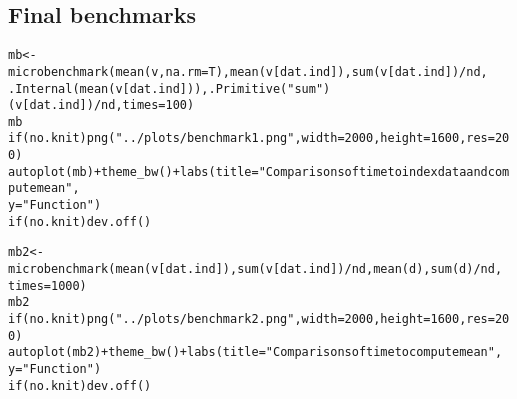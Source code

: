 \documentclass{article}\usepackage[]{graphicx}\usepackage[]{color}
\makeatletter
\newcommand{\hlnum}[1]{\textcolor[rgb]{0.863,0.196,0.184}{#1}}%
\newcommand{\hlstr}[1]{\textcolor[rgb]{0.863,0.196,0.184}{#1}}%
\newcommand{\hlopt}[1]{\textcolor[rgb]{0.576,0.631,0.631}{#1}}%
\newcommand{\hlstd}[1]{\textcolor[rgb]{0.514,0.58,0.588}{#1}}%
\newcommand{\hlkwa}[1]{\textcolor[rgb]{0.796,0.294,0.086}{#1}}%
\newcommand{\hlkwb}[1]{\textcolor[rgb]{0.522,0.6,0}{#1}}%
\newcommand{\hlkwc}[1]{\textcolor[rgb]{0.796,0.294,0.086}{#1}}%
\newcommand{\hlkwd}[1]{\textcolor[rgb]{0.576,0.631,0.631}{#1}}%
\newenvironment{kframe}{%
 \def\at@end@of@kframe{}%
 \ifinner\ifhmode%
  \def\at@end@of@kframe{\end{minipage}}%
  \begin{minipage}{\columnwidth}%
 \fi\fi%
 \def\FrameCommand##1{\hskip\@totalleftmargin \hskip-\fboxsep
 \colorbox{shadecolor}{##1}\hskip-\fboxsep
     \hskip-\linewidth \hskip-\@totalleftmargin \hskip\columnwidth}%
 \MakeFramed {\advance\hsize-\width
   \@totalleftmargin\z@ \linewidth\hsize
   \@setminipage}}%
 {\par\unskip\endMakeFramed%
 \at@end@of@kframe}
\newenvironment{knitrout}{}{} %
\makeatother
\begin{document}
\subsection{Final benchmarks}

\begin{knitrout}
\color{fgcolor}\begin{kframe}
\begin{alltt}
\hlstd{mb} \hlkwb{<-} \hlkwd{microbenchmark}\hlstd{(}\hlkwd{mean}\hlstd{(v,} \hlkwc{na.rm} \hlstd{= T),} \hlkwd{mean}\hlstd{(v[dat.ind]),} \hlkwd{sum}\hlstd{(v[dat.ind])}\hlopt{/}\hlstd{nd,}
    \hlkwd{.Internal}\hlstd{(}\hlkwd{mean}\hlstd{(v[dat.ind])),} \hlkwd{.Primitive}\hlstd{(}\hlstr{"sum"}\hlstd{)(v[dat.ind])}\hlopt{/}\hlstd{nd,} \hlkwc{times} \hlstd{=} \hlnum{100}\hlstd{)}
\hlstd{mb}
\hlkwa{if} \hlstd{(no.knit)} \hlkwd{png}\hlstd{(}\hlstr{"../plots/benchmark1.png"}\hlstd{,} \hlkwc{width} \hlstd{=} \hlnum{2000}\hlstd{,} \hlkwc{height} \hlstd{=} \hlnum{1600}\hlstd{,} \hlkwc{res} \hlstd{=} \hlnum{200}\hlstd{)}
\hlkwd{autoplot}\hlstd{(mb)} \hlopt{+} \hlkwd{theme_bw}\hlstd{()} \hlopt{+} \hlkwd{labs}\hlstd{(}\hlkwc{title} \hlstd{=} \hlstr{"Comparisons of time to index data and compute mean"}\hlstd{,}
    \hlkwc{y} \hlstd{=} \hlstr{"Function"}\hlstd{)}
\hlkwa{if} \hlstd{(no.knit)} \hlkwd{dev.off}\hlstd{()}
\end{alltt}
\end{kframe}
\end{knitrout}

\begin{knitrout}
\color{fgcolor}\begin{kframe}
\begin{alltt}
\hlstd{mb2} \hlkwb{<-} \hlkwd{microbenchmark}\hlstd{(}\hlkwd{mean}\hlstd{(v[dat.ind]),} \hlkwd{sum}\hlstd{(v[dat.ind])}\hlopt{/}\hlstd{nd,} \hlkwd{mean}\hlstd{(d),} \hlkwd{sum}\hlstd{(d)}\hlopt{/}\hlstd{nd,}
    \hlkwc{times} \hlstd{=} \hlnum{1000}\hlstd{)}
\hlstd{mb2}
\hlkwa{if} \hlstd{(no.knit)} \hlkwd{png}\hlstd{(}\hlstr{"../plots/benchmark2.png"}\hlstd{,} \hlkwc{width} \hlstd{=} \hlnum{2000}\hlstd{,} \hlkwc{height} \hlstd{=} \hlnum{1600}\hlstd{,} \hlkwc{res} \hlstd{=} \hlnum{200}\hlstd{)}
\hlkwd{autoplot}\hlstd{(mb2)} \hlopt{+} \hlkwd{theme_bw}\hlstd{()} \hlopt{+} \hlkwd{labs}\hlstd{(}\hlkwc{title} \hlstd{=} \hlstr{"Comparisons of time to compute mean"}\hlstd{,}
    \hlkwc{y} \hlstd{=} \hlstr{"Function"}\hlstd{)}
\hlkwa{if} \hlstd{(no.knit)} \hlkwd{dev.off}\hlstd{()}
\end{alltt}
\end{kframe}
\end{knitrout}
\end{document}
